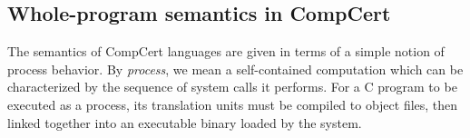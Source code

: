 \documentclass[sigplan,screen,review]{acmart}
\newenvironment{optional}{}{}
\begin{document}
\subsection{Whole-program semantics in CompCert} \label{sec:sem:closed} %


The semantics of CompCert languages
are given in terms of a simple notion of process behavior.
By \emph{process}, we mean a self-contained computation
which can be characterized by
the sequence of system calls it performs.
For a C program to be executed as a process,
its translation units must be compiled to object files,
then linked together
into an executable binary
loaded by the system.

%
%
\end{document}
